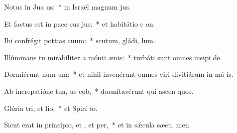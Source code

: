 \item Notus in Jua us:~* in Israël magnum  jus.
\item Et factus est in pace cus jus:~* et habitátio e  on.
\item Ibi confrégit pottias cuum:~* scutum, gládi,  lum.
\item Illúminans tu mirabíliter a mónti ænis:~* turbáti sunt omnes insipi de.
\item Dormiérunt num um:~* et nihil invenérunt omnes viri divitiárum in má is.
\item Ab increpatióne tua, us cob,~* dormitavérunt qui ascen quos.
\item Glória tri, et lio,~* et Spirí to.
\item Sicut erat in princípio, et , et per,~* et in sǽcula sæcu. men.
